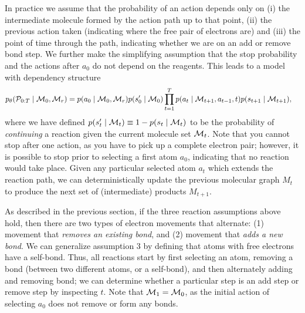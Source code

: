 In practice we assume that the probability of an action depends only on (i) the intermediate molecule formed by the action path up to that point, (ii) the previous action taken (indicating where the free pair of electrons are) and (iii) the point of time through the path, indicating whether we are on an add or remove bond step. 
We further make the simplifying assumption that the stop probability and the actions after $a_0$ do not depend on the reagents. This leads to a model with dependency structure
\begin{align}
p_\theta({\mathcal{P}}_{0:T} \mid {\mathcal{M}}_0, {\mathcal{M}}_r) 
&=
       p(a_0 \mid {\mathcal{M}}_0, {\mathcal{M}}_r)
       p(s'_0 \mid {\mathcal{M}}_0)
\prod_{t=1}^{T} 
	p(a_t \mid {\mathcal{M}}_{t+1}, a_{t-1}, t)
	p(s_{t+1} \mid {\mathcal{M}}_{t+1}),
\label{eq:jointprob}
\end{align}
where we have defined $p(s'_t \mid {\mathcal{M}}_t) \equiv 1 - p(s_t \mid {\mathcal{M}}_t)$ to be the probability of {\em continuing} a reaction given the current molecule set ${\mathcal{M}}_t$.
%
%
%
Note that you cannot stop after one action, as you have to pick up a complete electron pair;
however, it is possible to stop prior to selecting a first atom $a_0$, indicating that no reaction would take place.
Given any particular selected atom $a_t$ which extends the reaction path, we can deterministically update the previous molecular graph $M_{t}$ to produce the next set of (intermediate) products $M_{t+1}$.

As described in the previous section, if the three reaction assumptions above hold, then there are two types of electron movements that alternate: 
(1) movement that \emph{removes an existing bond}, and 
(2) movement that \emph{adds a new bond}. 
We can generalize assumption 3 by defining that atoms with free electrons have a self-bond. 
Thus, all reactions start by first selecting an atom, removing a bond (between two different atoms, or a self-bond), and then alternately adding and removing bond;
we can determine whether a particular step is an add step or remove step by inspecting $t$.
Note that ${\mathcal{M}}_1 = {\mathcal{M}}_0$, as the initial action of selecting $a_0$ does not remove or form any bonds.

